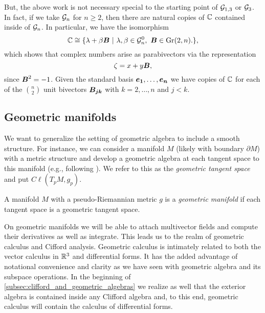 But, the above work is not necessary special to the starting point of $\mathcal{G}_{1,3}$ or $\mathcal{G}_3$. In fact, if we take $\mathcal{G}_n$ for $n\geq 2$, then there are natural copies of $\mathbb{C}$ contained inside of $\mathcal{G}_n$. In particular, we have the isomorphism
\begin{equation}
    \mathbb{C} \cong \{\lambda + \beta \boldsymbol{B} ~\vert~ \lambda,\beta \in \mathcal{G}_n^0,~ \boldsymbol{B} \in \operatorname{Gr}(2,n). \},
\end{equation}
which shows that complex numbers arise as parabivectors via the representation
\begin{equation}
        \zeta = x + y\boldsymbol{B},
\end{equation}
since $\boldsymbol{B}^2=-1$. Given the standard basis $\boldsymbol{e_1},\dots,\boldsymbol{e_n}$ we have copies of $\mathbb{C}$ for each of the ${ n \choose 2}$ unit bivectors $\boldsymbol{B_{jk}}$ with $k=2,\dots,n$ and $j<k$.





\subsection{Geometric manifolds}

We want to generalize the setting of geometric algebra to include a smooth structure. For instance, we can consider a manifold $M$ (likely with boundary $\partial M$) with a metric structure and develop a geometric algebra at each tangent space to this manifold (e.g., following \cite{schindler_geometric_2020}). We refer to this as the \emph{geometric tangent space} and put $C\ell(T_pM,g_p)$.
\begin{definition}
A manifold $M$ with a pseudo-Riemannian metric $g$ is a \emph{geometric manifold} if each tangent space is a geometric tangent space.
\end{definition}
On geometric manifolds we will be able to attach multivector fields and compute their derivatives as well as integrate. This leads us to the realm of geometric calculus and Cifford analysis. Geometric calculus is intimately related to both the vector calculus in $\mathbb{R}^3$ and differential forms. It has the added advantage of notational convenience and clarity as we have seen with geometric algebra and its subspace operations. In the beginning of \cref{subsec:clifford_and_geometric_algebras} we realize as well that the exterior algebra is contained inside any Clifford algebra and, to this end, geometric calculus will contain the calculus of differential forms. 

